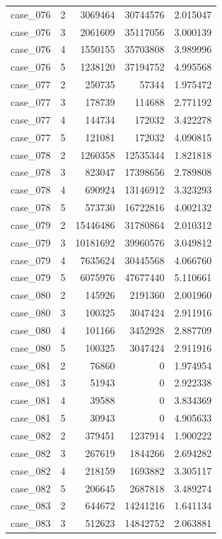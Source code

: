 \begin{longtable}{lrrrr}
case\_076 & 2 & 3069464 & 30744576 & 2.015047 \\
case\_076 & 3 & 2061609 & 35117056 & 3.000139 \\
case\_076 & 4 & 1550155 & 35703808 & 3.989996 \\
case\_076 & 5 & 1238120 & 37194752 & 4.995568 \\
case\_077 & 2 & 250735 & 57344 & 1.975472 \\
case\_077 & 3 & 178739 & 114688 & 2.771192 \\
case\_077 & 4 & 144734 & 172032 & 3.422278 \\
case\_077 & 5 & 121081 & 172032 & 4.090815 \\
case\_078 & 2 & 1260358 & 12535344 & 1.821818 \\
case\_078 & 3 & 823047 & 17398656 & 2.789808 \\
case\_078 & 4 & 690924 & 13146912 & 3.323293 \\
case\_078 & 5 & 573730 & 16722816 & 4.002132 \\
case\_079 & 2 & 15446486 & 31780864 & 2.010312 \\
case\_079 & 3 & 10181692 & 39960576 & 3.049812 \\
case\_079 & 4 & 7635624 & 30445568 & 4.066760 \\
case\_079 & 5 & 6075976 & 47677440 & 5.110661 \\
case\_080 & 2 & 145926 & 2191360 & 2.001960 \\
case\_080 & 3 & 100325 & 3047424 & 2.911916 \\
case\_080 & 4 & 101166 & 3452928 & 2.887709 \\
case\_080 & 5 & 100325 & 3047424 & 2.911916 \\
case\_081 & 2 & 76860 & 0 & 1.974954 \\
case\_081 & 3 & 51943 & 0 & 2.922338 \\
case\_081 & 4 & 39588 & 0 & 3.834369 \\
case\_081 & 5 & 30943 & 0 & 4.905633 \\
case\_082 & 2 & 379451 & 1237914 & 1.900222 \\
case\_082 & 3 & 267619 & 1844266 & 2.694282 \\
case\_082 & 4 & 218159 & 1693882 & 3.305117 \\
case\_082 & 5 & 206645 & 2687818 & 3.489274 \\
case\_083 & 2 & 644672 & 14241216 & 1.641134 \\
case\_083 & 3 & 512623 & 14842752 & 2.063881 \\

\end{longtable}
